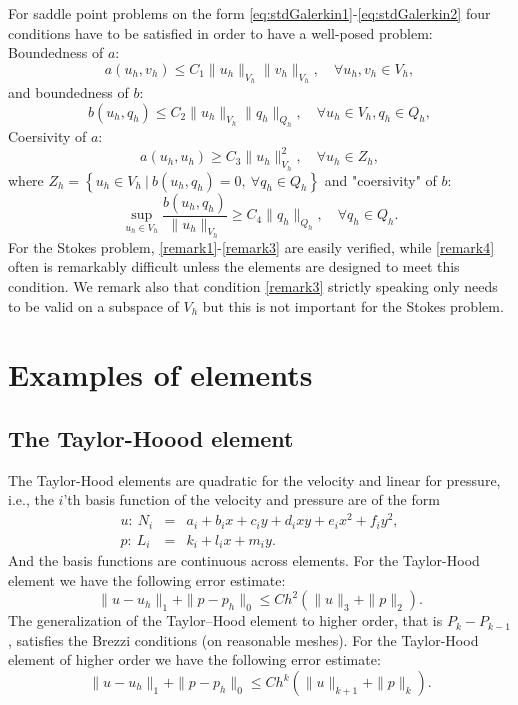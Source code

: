 \begin{remark}
For saddle point problems on the form \eqref{eq:stdGalerkin1}-\eqref{eq:stdGalerkin2} four conditions
have to be satisfied in order to have a well-posed problem: \\
Boundedness of $a$:
\begin{equation}
\label{remark1}
a(u_h, v_h) \le C_1 \|u_h\|_{V_h} \|v_h\|_{V_h}, \quad \forall u_h, v_h \in V_h,
\end{equation}
and boundedness of $b$:
\begin{equation}
\label{remark2}
b(u_h, q_h) \le C_2 \|u_h\|_{V_h} \|q_h\|_{Q_h},  \quad \forall u_h \in V_h,  q_h \in Q_h,
\end{equation}
Coersivity of $a$:
\begin{equation}
\label{remark3}
a(u_h, u_h) \ge C_3 \|u_h\|^2_{V_h} , \quad \forall u_h \in Z_h,
\end{equation}
where $Z_h=\left\{u_h \in V_h \ | \ b(u_h, q_h) = 0, \  \forall q_h\in Q_h\right\}$ and "coersivity" of $b$:
\begin{equation}
\label{remark4}
\sup_{u_h\in V_h} \frac{b(u_h, q_h)}{\|u_h\|_{V_h}} \ge C_4 \|q_h\|_{Q_h} , \quad \forall q_h \in Q_h.
\end{equation}
For the Stokes problem, \eqref{remark1}-\eqref{remark3} are easily verified, while \eqref{remark4} often
is remarkably difficult unless the elements are designed to meet this condition.
We remark also that condition \eqref{remark3} strictly speaking only needs to be valid on a subspace of $V_h$
but this is not important for the Stokes problem. 
\end{remark}



\section{Examples of elements}
\subsection{The Taylor-Hoood element}
The Taylor-Hood elements are quadratic for the velocity and linear for pressure, i.e., 
the $i$'th basis function of the velocity and pressure are of the form
\begin{eqnarray*}
u:\ N_i &=& a_i + b_i x + c_i y + d_i xy + e_i x^2 + f_i y^2, \\
p:\ L_i &=& k_i + l_i x + m_i y.
\end{eqnarray*}
And the basis functions are continuous across elements.
For the Taylor-Hood element we have the following error estimate:
\[\|u-u_h\|_1 + \|p-p_h\|_0 \le Ch^2 (\|u\|_{3} + \|p\|_{2}).\]
The generalization of the Taylor--Hood element to higher order, that is 
$P_k-P_{k-1}$, satisfies the Brezzi conditions (on reasonable meshes). 
For the Taylor-Hood element of higher order we have the following error estimate:
\[\|u-u_h\|_1 + \|p-p_h\|_0 \le Ch^k (\|u\|_{k+1} + \|p\|_{k}).\]


